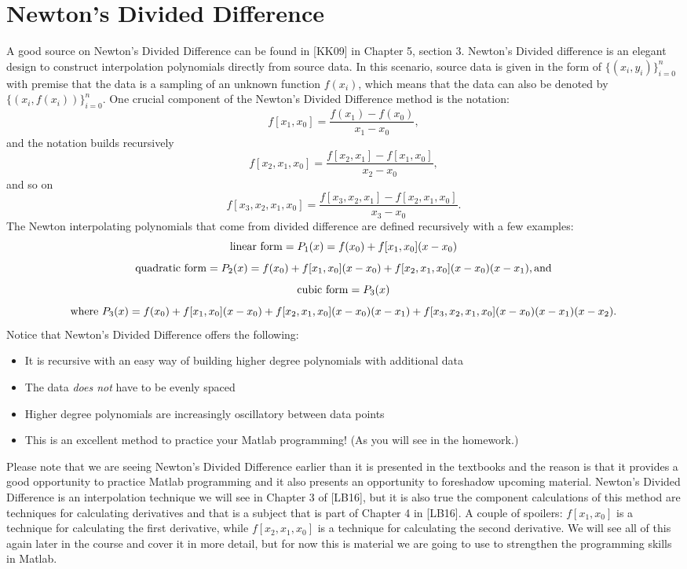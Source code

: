 \documentclass[twoside]{article}
\renewcommand{\cite}[1]{[#1]}
\def\ds{\displaystyle}
\begin{document}
\section{Newton's Divided Difference}\label{section_div_diff}
A good source on Newton's Divided Difference can be found in \cite{KK09} in Chapter 5, section 3. Newton's Divided difference is an elegant design to construct interpolation polynomials directly from source data. In this scenario, source data is given in the form of $\ds \{(x_i,y_i) \} _{i=0}^n$ with premise that the data is a sampling of an unknown function $\ds f(x_i)$, which means that the data can also be denoted by $\ds \{(x_i,f(x_i)) \} _{i=0}^n$. One crucial component of the Newton's Divided Difference method is the notation:
$$f[x_1,x_0] = \frac {f(x_1)-f(x_0)}{x_1-x_0}, $$
and the notation builds recursively 
$$f[x_2,x_1,x_0]=\frac {f[x_2,x_1]-f[x_1,x_0]}{x_2-x_0},$$
and so on
$$f[x_3,x_2,x_1,x_0]=\frac {f[x_3,x_2,x_1]-f[x_2,x_1,x_0]}{x_3-x_0}.$$
The Newton interpolating polynomials that come from divided difference are defined recursively with a few examples:
$${\rm linear \ form}= P_1(x) = f(x_0) + f[x_1,x_0](x-x_0)$$
$${\rm quadratic \ form}= P_2(x) = f(x_0) + f[x_1,x_0](x-x_0) + f[x_2,x_1,x_0](x-x_0)(x-x_1), {\rm and}$$
$${\rm cubic \ form} = P_3(x)$$
$${\rm where} \ P_3(x) = f(x_0) + f[x_1,x_0](x-x_0) + f[x_2,x_1,x_0](x-x_0)(x-x_1) +  f[x_3,x_2,x_1,x_0](x-x_0)(x-x_1)(x-x_2).$$
Notice that Newton's Divided Difference offers the following:
\begin{itemize}
    \item It is recursive with an easy way of building higher degree polynomials with additional data
    \item The data {\it does not} have to be evenly spaced
    \item Higher degree polynomials are increasingly oscillatory between data points
    \item This is an excellent method to practice your Matlab programming! (As you will see in the homework.)
\end{itemize}
Please note that we are seeing Newton's Divided Difference earlier than it is presented in the textbooks and the reason is that it provides a good opportunity to practice Matlab programming and it also presents an opportunity to foreshadow upcoming material. Newton's Divided Difference is an interpolation technique we will see in Chapter 3 of \cite{LB16}, but it is also true the component calculations of this method are techniques for calculating derivatives and that is a subject that is part of Chapter 4 in \cite{LB16}. A couple of spoilers: $\ds f[x_1,x_0]$ is a technique for calculating the first derivative, while $\ds f[x_2,x_1,x_0]$ is a technique for calculating the second derivative. We will see all of this again later in the course and cover it in more detail, but for now this is material we are going to use to strengthen the programming skills in Matlab.  
\end{document}

